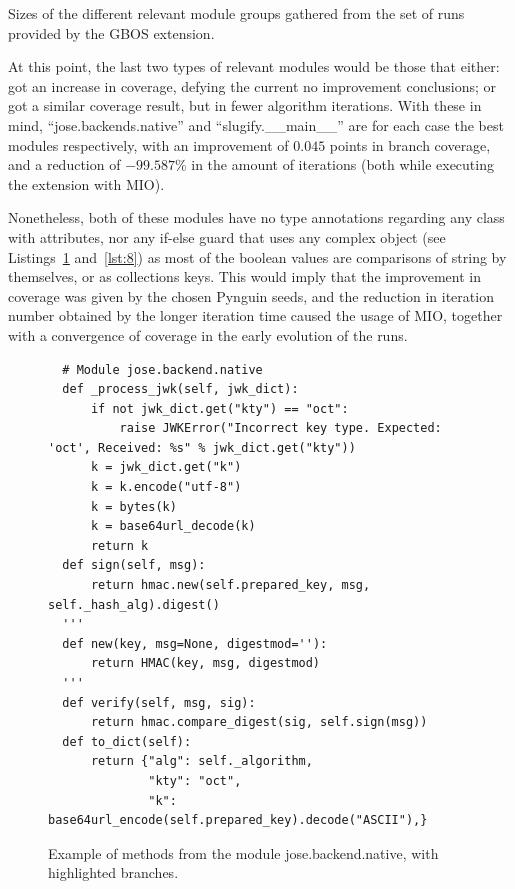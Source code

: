 \documentclass[%
  chapterprefix=false,%
  open=right,%
  twoside=true,%
  paper=a4,%
  logofile={Figures/logo.png},%
  thesistype=master,%
  UKenglish,%
]{se2thesis}
\begin{document}
\begin{table}[t]
  \centering
  
\caption{Sizes of the different relevant module groups gathered from the set of runs provided by the GBOS extension.}\label{tab:flag_modules}
\end{table}

At this point, the last two types of relevant modules would be those that either: got an increase in coverage, defying the current no improvement conclusions; or got a similar coverage result, but in fewer algorithm iterations.
With these in mind, ``jose.backends.native'' and ``slugify.\_\_main\_\_'' are for each case the best modules respectively, with an improvement of \(0.045\) points in branch coverage, and a reduction of \(-99.587\%\) in the amount of iterations (both while executing the extension with MIO).

Nonetheless, both of these modules have no type annotations regarding any class with attributes, nor any if-else guard that uses any complex object (see Listings~\ref{lst:7} and~\ref{lst:8}) as most of the boolean values are comparisons of string by themselves, or as collections keys.
This would imply that the improvement in coverage was given by the chosen Pynguin seeds, and the reduction in iteration number obtained by the longer iteration time caused the usage of MIO, together with a convergence of coverage in the early evolution of the runs.

\begin{figure}
\begin{verbatim}
  # Module jose.backend.native
  def _process_jwk(self, jwk_dict):
      if not jwk_dict.get("kty") == "oct":
          raise JWKError("Incorrect key type. Expected: 'oct', Received: %s" % jwk_dict.get("kty"))
      k = jwk_dict.get("k")
      k = k.encode("utf-8")
      k = bytes(k)
      k = base64url_decode(k)
      return k
  def sign(self, msg):
      return hmac.new(self.prepared_key, msg, self._hash_alg).digest()
  '''
  def new(key, msg=None, digestmod=''):
      return HMAC(key, msg, digestmod)
  '''
  def verify(self, msg, sig):
      return hmac.compare_digest(sig, self.sign(msg))
  def to_dict(self):
      return {"alg": self._algorithm,
              "kty": "oct",
              "k": base64url_encode(self.prepared_key).decode("ASCII"),}
\end{verbatim}
\caption{Example of methods from the module jose.backend.native, with highlighted branches.}\label{lst:7}
\end{figure}
\end{document}
